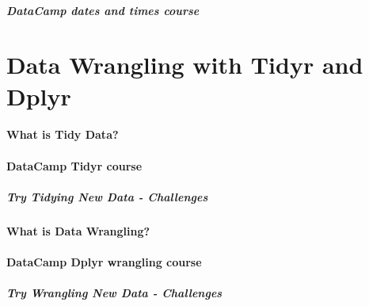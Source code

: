 \documentclass[]{book}
\let\oldparagraph\paragraph
\renewcommand{\paragraph}[1]{\oldparagraph{#1}\mbox{}}
\theoremstyle{definition}
\theoremstyle{definition}
\theoremstyle{definition}
\theoremstyle{remark}
\begin{document}
\hypertarget{datacamp-dates-and-times-course}{%
\paragraph{DataCamp dates and times
course}\label{datacamp-dates-and-times-course}}

\hypertarget{data-wrangling-with-tidyr-and-dplyr}{%
\chapter{Data Wrangling with Tidyr and
Dplyr}\label{data-wrangling-with-tidyr-and-dplyr}}

\hypertarget{what-is-tidy-data}{%
\subsubsection{What is Tidy Data?}\label{what-is-tidy-data}}

\hypertarget{datacamp-tidyr-course}{%
\subsubsection{DataCamp Tidyr course}\label{datacamp-tidyr-course}}

\hypertarget{try-tidying-new-data---challenges}{%
\paragraph{Try Tidying New Data -
Challenges}\label{try-tidying-new-data---challenges}}

\hypertarget{what-is-data-wrangling}{%
\subsubsection{What is Data Wrangling?}\label{what-is-data-wrangling}}

\hypertarget{datacamp-dplyr-wrangling-course}{%
\subsubsection{DataCamp Dplyr wrangling
course}\label{datacamp-dplyr-wrangling-course}}

\hypertarget{try-wrangling-new-data---challenges}{%
\paragraph{Try Wrangling New Data -
Challenges}\label{try-wrangling-new-data---challenges}}
\end{document}
